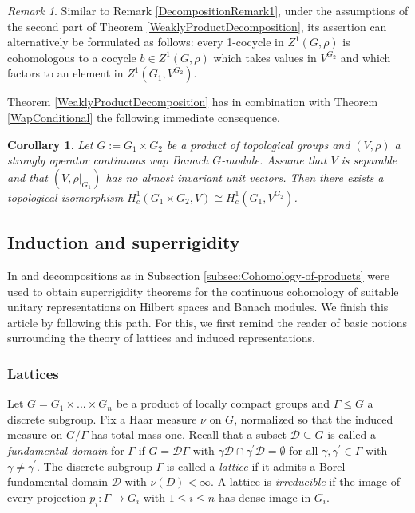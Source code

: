 \documentclass[a4paper,11pt,reqno]{amsart}
\numberwithin{equation}{section}
\newtheorem{corollary}[theorem]{Corollary}
\theoremstyle{definition}
\theoremstyle{remark}
\theoremstyle{remark}
\newtheorem{remark}[theorem]{Remark}
\begin{document}
\begin{remark} \label{DecompositionRemark2} Similar to Remark \ref{DecompositionRemark1}, under the assumptions of the second part of Theorem \ref{WeaklyProductDecomposition}, its assertion can alternatively be formulated as follows: every 1-cocycle in $Z^{1}(G,\rho)$ is cohomologous to a cocycle $b\in Z^{1}(G,\rho)$ which takes values in $V^{G_{2}}$ and which factors to an element in $Z^{1}(G_{1},V^{G_{2}})$. \end{remark}

Theorem \ref{WeaklyProductDecomposition} has in combination with Theorem \ref{WapConditional} the following immediate consequence.

\begin{corollary} Let $G:=G_{1}\times G_{2}$ be a product of topological groups and $(V,\rho)$ a strongly operator continuous wap Banach $G$-module. Assume that $V$ is separable and that $(V,\rho|_{G_{1}})$ has no almost invariant unit vectors. Then there exists a topological isomorphism ${H}_{c}^{1}(G_{1}\times G_{2},V)\cong{H}_{c}^{1}(G_{1},V^{G_{2}})$. \end{corollary}

\vspace{3mm}


\subsection{Induction and superrigidity\label{Subsec:InductionAndSuperrigidity}}

In \cite{Shalom00} and \cite{BaderFurmanGelanderMonod} decompositions as in Subsection \ref{subsec:Cohomology-of-products} were used to obtain superrigidity theorems for the continuous cohomology of suitable unitary representations on Hilbert spaces and Banach modules. We finish this article by following this path. For this, we first remind the reader of basic notions surrounding the theory of lattices and induced representations.

\vspace{3mm}


\subsubsection{Lattices}

Let $G=G_{1}\times...\times G_{n}$ be a product of locally compact groups and $\Gamma\leq G$ a discrete subgroup. Fix a Haar measure $\nu$ on $G$, normalized so that the induced measure on $G/\Gamma$ has total mass one. Recall that a subset $\mathcal{D}\subseteq G$ is called a \emph{fundamental domain} for $\Gamma$ if $G=\mathcal{D}\Gamma$ with $\gamma\mathcal{D}\cap\gamma^{\prime}\mathcal{D}=\emptyset$ for all $\gamma,\gamma^{\prime}\in\Gamma$ with $\gamma\neq\gamma^{\prime}$. The discrete subgroup $\Gamma$ is called a \emph{lattice} if it admits a Borel fundamental domain $\mathcal{D}$ with $\nu(D)<\infty$. A lattice is \emph{irreducible} if the image of every projection $p_{i}:\Gamma\rightarrow G_{i}$ with $1\leq i\leq n$ has dense image in $G_{i}$.
\end{document}
